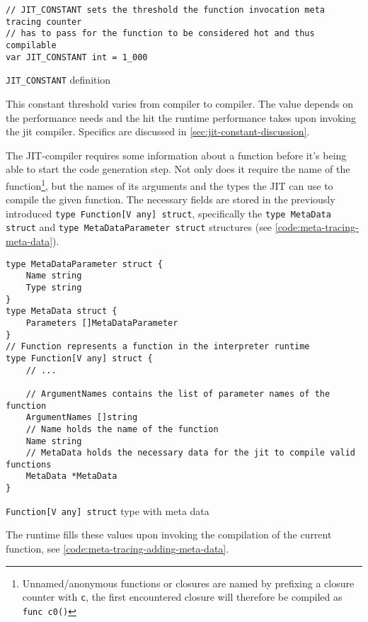 \begin{listing}[H]
    \begin{verbatim}
// JIT_CONSTANT sets the threshold the function invocation meta tracing counter
// has to pass for the function to be considered hot and thus compilable
var JIT_CONSTANT int = 1_000
    \end{verbatim}
    \caption{\texttt{JIT\_CONSTANT} definition}
    \label{code:jit-constant}
\end{listing}

This constant threshold varies from compiler to compiler. The value depends on
the performance needs and the hit the runtime performance takes upon
invoking the jit compiler. Specifics are discussed in \autoref{sec:jit-constant-discussion}.

The JIT-compiler requires some information about a function before it's being
able to start the code generation step. Not only does it require the name of
the function\footnote{Unnamed/anonymous functions or closures are named by
prefixing a closure counter with \texttt{c}, the first encountered closure
will therefore be compiled as \texttt{func c0()}}, but the names of its
arguments and the types the JIT can use to compile the given function. The
necessary fields are stored in the previously introduced \texttt{type Function[V any] struct},
specifically the \texttt{type MetaData struct}
and \texttt{type MetaDataParameter struct} structures (see
\autoref{code:meta-tracing-meta-data}).

\begin{listing}[H]
    \begin{verbatim}
type MetaDataParameter struct {
	Name string
	Type string
}
type MetaData struct {
	Parameters []MetaDataParameter
}
// Function represents a function in the interpreter runtime
type Function[V any] struct {
    // ...

    // ArgumentNames contains the list of parameter names of the function
    ArgumentNames []string
    // Name holds the name of the function
    Name string
    // MetaData holds the necessary data for the jit to compile valid functions
    MetaData *MetaData
}
    \end{verbatim}
    \caption{\texttt{Function[V any] struct} type with meta data}
    \label{code:meta-tracing-meta-data}
\end{listing}

The runtime fills these values upon invoking the compilation of the current
function, see \autoref{code:meta-tracing-adding-meta-data}.

